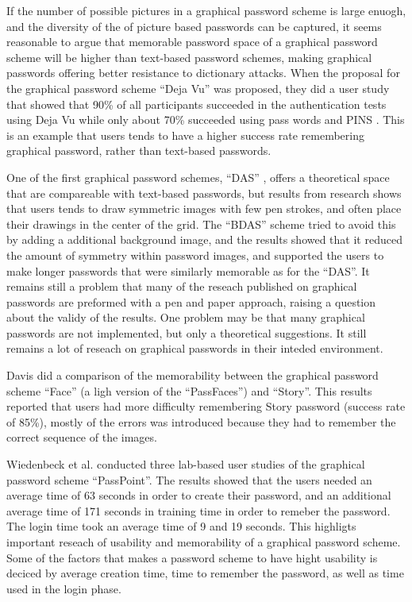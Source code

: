   If the number of possible pictures in a graphical password scheme is large enuogh, and the diversity of the of picture based passwords can be captured, it seems reasonable to argue that memorable password space of a graphical password scheme will be higher than text-based password schemes, making graphical passwords offering better resistance to dictionary attacks.
  When the proposal for the graphical password scheme ``Deja Vu'' was proposed, they did a user study that showed that 90\% of all participants succeeded in the authentication tests using Deja Vu while only about 70\% succeeded using pass words and PINS \cite{DejaVu}. This is an example that users tends to have a higher success rate remembering graphical password, rather than text-based passwords. 

  One of the first graphical password schemes, ``DAS'' \cite{Jermyn}, offers a theoretical space that are compareable with text-based passwords, but results from research shows that users tends to draw symmetric images with few pen strokes, and often place their drawings in the center of the grid. The ``BDAS'' scheme \cite{BDAS} tried to avoid this by adding a additional background image, and the results showed that it reduced the amount of symmetry within password images, and supported the users to make longer passwords that were similarly memorable as for the ``DAS''. It remains still a problem that many of the reseach published on graphical passwords are preformed with a pen and paper approach, raising a question about the validy of the results. One problem may be that many graphical passwords are not implemented, but only a theoretical suggestions. It still remains a lot of reseach on graphical passwords in their inteded environment. 

  Davis \cite{Davis} did a comparison of the memorability between the graphical password scheme ``Face'' (a ligh version of the ``PassFaces'') and ``Story''. This results reported that users had more difficulty remembering Story password (success rate of 85\%), mostly of the errors was introduced because they had to remember the correct sequence of the images. 

  Wiedenbeck et al. \cite{Wiedenbeck1, Wiedenbeck2, Wiedenbeck3} conducted three lab-based user studies of the graphical password scheme ``PassPoint''. The results showed that the users needed an average time of 63 seconds in order to create their password, and an additional average time of 171 seconds in training time in order to remeber the password. The login time took an average time of 9 and 19 seconds. This highligts important reseach of usability and memorability of a graphical password scheme. Some of the factors that makes a password scheme to have hight usability is deciced by average creation time, time to remember the password, as well as time used in the login phase. 


